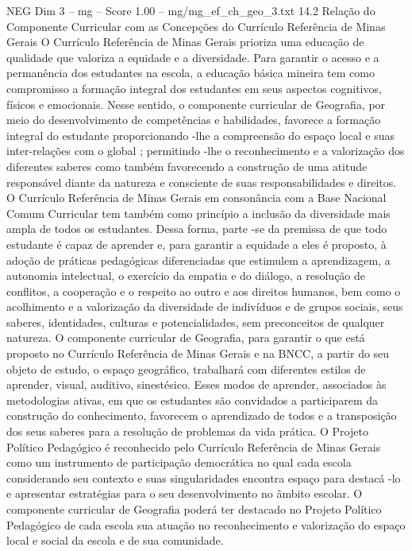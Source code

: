 \begin{textsample}{NEG Dim 3 – mg – Score 1.00 – mg/mg\_ef\_ch\_geo\_3.txt}  \label{ex:f3_neg_023}
14.2 Relação do Componente Curricular com as Concepções do Currículo Referência de Minas Gerais O Currículo Referência de Minas Gerais prioriza uma educação de qualidade que valoriza a equidade e a diversidade.
Para garantir o acesso e a permanência dos estudantes na escola, a educação básica mineira tem como compromisso a formação integral dos estudantes em seus aspectos cognitivos, físicos e emocionais.
Nesse sentido, o componente curricular de Geografia, por meio do desenvolvimento de competências e habilidades, favorece a formação integral do estudante proporcionando -lhe a compreensão do espaço local e suas inter-relações com o global ; permitindo -lhe o reconhecimento e a valorização dos diferentes saberes como também favorecendo a construção de uma atitude responsável diante da natureza e consciente de suas responsabilidades e direitos.
O Currículo Referência de Minas Gerais em consonância com a Base Nacional Comum Curricular tem também como princípio a inclusão da diversidade mais ampla de todos os estudantes.
Dessa forma, parte -se da premissa de que todo estudante é capaz de aprender e, para garantir a equidade a eles é proposto, à adoção de práticas pedagógicas diferenciadas que estimulem a aprendizagem, a autonomia intelectual, o exercício da empatia e do diálogo, a resolução de conflitos, a cooperação e o respeito ao outro e aos direitos humanos, bem como o acolhimento e a valorização da diversidade de indivíduos e de grupos sociais, seus saberes, identidades, culturas e potencialidades, sem preconceitos de qualquer natureza.
O componente curricular de Geografia, para garantir o que está proposto no Currículo Referência de Minas Gerais e na BNCC, a partir do seu objeto de estudo, o espaço geográfico, trabalhará com diferentes estilos de aprender, visual, auditivo, sinestésico.
Esses modos de aprender, associados às metodologias ativas, em que os estudantes são convidados a participarem da construção do conhecimento, favorecem o aprendizado de todos e a transposição dos seus saberes para a resolução de problemas da vida prática.
O Projeto Político Pedagógico é reconhecido pelo Currículo Referência de Minas Gerais como um instrumento de participação democrática no qual cada escola considerando seu contexto e suas singularidades encontra espaço para destacá -lo e apresentar estratégias para o seu desenvolvimento no âmbito escolar.
O componente curricular de Geografia poderá ter destacado no Projeto Político Pedagógico de cada escola sua atuação no reconhecimento e valorização do espaço local e social da escola e de sua comunidade.

\end{textsample}
